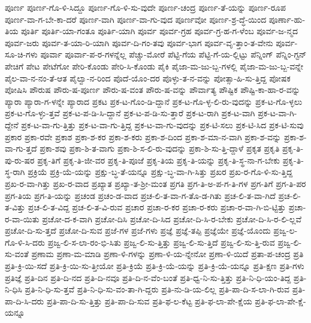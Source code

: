 {ಪೂರ್ಣ
ಪೂರ್ಣ-ಗೊ-ಳಿ-ಸಿದ್ದೂ
ಪೂರ್ಣ-ಗೊ-ಳಿ-ಸು-ವುದೇ
ಪೂರ್ಣ-ಚಂದ್ರ
ಪೂರ್ಣ-ತೆ-ಯನ್ನು
ಪೂರ್ಣ-ರೂಪ
ಪೂರ್ಣ-ವಾ-ಗ-ಬೇ-ಕಾ-ದರೆ
ಪೂರ್ಣ-ವಾಗಿ
ಪೂರ್ಣ-ವಾ-ಗು-ವುದ
ಪೂರ್ಣವೋ
ಪೂರ್ಣ-ಶ್ರ-ದ್ಧೆ-ಯಿಂದ
ಪೂರ್ಣಾ-ಹು-ತಿಯ
ಪೂರ್ತಿ
ಪೂರ್ತಿ-ಯಾ-ಗಂತೂ
ಪೂರ್ತಿ-ಯಾಗಿ
ಪೂರ್ವ
ಪೂರ್ವ-ಗ್ರಹ
ಪೂರ್ವ-ಗ್ರ-ಹ-ಗ-ಳೆಂಬ
ಪೂರ್ವ-ಜ-ನ್ಮದ
ಪೂರ್ವ-ಜರು
ಪೂರ್ವ-ತ-ಯಾ-ರಿ-ಯಾಗಿ
ಪೂರ್ವ-ದಿ-ಗಂ-ತವು
ಪೂರ್ವ-ಭಾಗ
ಪೂರ್ವ-ವೃ-ತ್ತಾಂ-ತ-ವೇನು
ಪೂರ್ವ-ಸೂ-ಚಿ-ಗಳು
ಪೂರ್ವಾ
ಪೂರ್ವಾ-ಪ-ರ-ಗಳನ್ನೆಲ್ಲ
ಪೆಚ್ಚು-ಮೋರೆ
ಪೆಟ್ಟಿ-ಗೆಯ
ಪೆಟ್ಟಿ-ಗೆ-ಯ-ಲ್ಲಿಟ್ಟು
ಪೆನ್ನಿಂಗ್
ಪೆನ್ನಿಂ-ಗ್ಟನ್
ಪೇಚಿಗೆ
ಪೇಟ
ಪೇಟೆಗೋ
ಪೇರಿ-ಕೊಂಡು
ಪೇರಿ-ಸಿ-ಕೊಂಡು
ಪೈಕಿ
ಪೈಜಾ-ಮ-ಜು-ಬ್ಬ-ಗಳಲ್ಲಿ
ಪೈಜಾ-ಮ-ಜು-ಬ್ಬ-ವನ್ನೇ
ಪೈಲ-ವಾ-ನ-ನಂ-ತೆ-ಆತ
ಪೈಲ್ವಾ-ನ-ರಿಂದ
ಪೊದೆ-ಯೊಂ-ದರ
ಪೊಳ್ಳು-ತ-ನ-ವನ್ನು
ಪೋತ್ಸಾ-ಹಿ-ಸು-ತ್ತಿದ್ದ
ಪೋಷಕ
ಪೋಷಿಸಿ
ಪೌರುಷ
ಪೌರು-ಷ-ಪೂರ್ಣ
ಪೌರು-ಷ-ವಂತ
ಪೌರು-ಷ-ವನ್ನು
ಪೌರ್ವಾತ್ಯ
ಪೌಷ್ಟಿಕ
ಪೌಷ್ಟಿ-ಕಾ-ಹಾ-ರ-ವನ್ನು
ಪ್ಯಾರಾ
ಪ್ಯಾರಾ-ಗ-ಳನ್ನೇ
ಪ್ಯಾರಾದ
ಪ್ರಕಟ
ಪ್ರಕ-ಟ-ಗೊಂ-ಡಿ-ದ್ದಾನೆ
ಪ್ರಕ-ಟ-ಗೊ-ಳ್ಳ-ಲಿ-ರು-ವುದನ್ನು
ಪ್ರಕ-ಟ-ಗೊ-ಳ್ಳಲು
ಪ್ರಕ-ಟ-ಗೊ-ಳ್ಳು-ತ್ತವೆ
ಪ್ರಕ-ಟ-ಪ-ಡಿ-ಸಿ-ದ್ದಾನೆ
ಪ್ರಕ-ಟ-ಪ-ಡಿ-ಸು-ತ್ತಾರೆ
ಪ್ರಕ-ಟ-ರಾಗಿ
ಪ್ರಕ-ಟ-ವಾಗಿ
ಪ್ರಕ-ಟ-ವಾ-ಗಿ-ದ್ದೇನೆ
ಪ್ರಕ-ಟ-ವಾ-ಗು-ತ್ತಿತ್ತು
ಪ್ರಕ-ಟ-ವಾ-ಗು-ತ್ತಿದ್ದ
ಪ್ರಕ-ಟ-ವಾ-ಗು-ವುದನ್ನು
ಪ್ರಕ-ಟಿ-ಸಲು
ಪ್ರಕ-ಟಿ-ಸಿದ
ಪ್ರಕ-ಟಿ-ಸುವು
ಪ್ರಕಾರ
ಪ್ರಕಾ-ರವೇ
ಪ್ರಕಾಶ
ಪ್ರಕಾ-ಶ-ಕರ
ಪ್ರಕಾ-ಶ-ಕರು
ಪ್ರಕಾ-ಶ-ದಿಂದ
ಪ್ರಕಾ-ಶ-ಮಾ-ನ-ವಾಗಿ
ಪ್ರಕಾ-ಶ-ವನ್ನು
ಪ್ರಕಾ-ಶ-ವಾ-ಗು-ತ್ತದೆ
ಪ್ರಕಾ-ಶವು
ಪ್ರಕಾ-ಶಿ-ತ-ವಾಗು
ಪ್ರಕಾ-ಶಿ-ಸ-ಲಿ-ರು-ವುದನ್ನು
ಪ್ರಕಾ-ಶಿ-ಸು-ತ್ತಿ-ದ್ದಾಳೆ
ಪ್ರಕೃತ
ಪ್ರಕೃತಿ
ಪ್ರಕೃ-ತಿ-ಪು-ರು-ಷರ
ಪ್ರಕೃ-ತಿಗೆ
ಪ್ರಕೃ-ತಿ-ಜೀ-ವರ
ಪ್ರಕೃ-ತಿ-ಪೂಜೆ
ಪ್ರಕೃ-ತಿಯ
ಪ್ರಕೃ-ತಿ-ಯನ್ನು
ಪ್ರಕೃ-ತಿ-ಸ್ಥ-ನಾ-ಗ-ಬೇಕು
ಪ್ರಕೃ-ತಿ-ಸ್ಥ-ರಾಗಿ
ಪ್ರಕ್ರಿಯೆ
ಪ್ರಕ್ರಿ-ಯೆ-ಯನ್ನು
ಪ್ರಕ್ಷು-ಬ್ಧ-ತೆ-ಯನ್ನೂ
ಪ್ರಕ್ಷು-ಬ್ಧ-ವಾ-ಗಿ-ಸಿತ್ತು
ಪ್ರಖರ
ಪ್ರಖ-ರ-ಗೊ-ಳಿ-ಸು-ತ್ತಿದ್ದ
ಪ್ರಖ-ರ-ವಾ-ಗಿತ್ತು
ಪ್ರಖ-ರ-ವಾದ
ಪ್ರಖ್ಯಾತ
ಪ್ರಖ್ಯಾ-ತ-ಶ್ರೀ-ಮಂತ
ಪ್ರಗತಿ
ಪ್ರಗ-ತಿ-ಅ-ಪ-ಗ-ತಿ-ಗಳ
ಪ್ರಗ-ತಿಗೆ
ಪ್ರಗ-ತಿ-ಪರ
ಪ್ರಗ-ತಿಯ
ಪ್ರಗ-ತಿ-ಯನ್ನು
ಪ್ರಚಂಡ
ಪ್ರಚಂ-ಡ-ವಾದ
ಪ್ರಚ-ಲಿ-ತ-ವಾ-ಗ-ತೊ-ಡ-ಗಿತು
ಪ್ರಚ-ಲಿ-ತ-ವಾ-ಗಿದೆ
ಪ್ರಚ-ಲಿ-ತ-ವಿತ್ತು
ಪ್ರಚ-ಲಿ-ತ-ವಿದ್ದ
ಪ್ರಚ-ಲಿ-ತ-ವಿ-ರುವ
ಪ್ರಚಾರ
ಪ್ರಚಾ-ರ-ಕರ
ಪ್ರಚಾ-ರ-ಕರು
ಪ್ರಚಾ-ರ-ವಾ-ಗಿ-ಬಿ-ಟ್ಟಿತ್ತು
ಪ್ರಚಾ-ರ-ವಾ-ಯಿತು
ಪ್ರಚೋ-ದ-ಕ-ವಾಗಿ
ಪ್ರಚೋ-ದಿಸಿ
ಪ್ರಚೋ-ದಿ-ಸಿದ
ಪ್ರಚೋ-ದಿ-ಸಿ-ರ-ಬೇಕು
ಪ್ರಚೋ-ದಿ-ಸಿ-ರ-ಲಿ-ಲ್ಲವೆ
ಪ್ರಚೋ-ದಿ-ಸು-ತ್ತದೆ
ಪ್ರಚೋ-ದಿ-ಸುವ
ಪ್ರಜೆ-ಗಳ
ಪ್ರಜೆ-ಗಳು
ಪ್ರಜ್ಞೆ
ಪ್ರಜ್ಞೆ-ತಪ್ಪಿ
ಪ್ರಜ್ಞೆಯೇ
ಪ್ರಜ್ಞೆ-ಯೊಂದು
ಪ್ರಜ್ವ-ಲ-ಗೊ-ಳಿ-ಸಿ-ದರು
ಪ್ರಜ್ವ-ಲಿ-ಸ-ಲಾ-ರಂ-ಭಿ-ಸಿತು
ಪ್ರಜ್ವ-ಲಿ-ಸು-ತ್ತಿತ್ತು
ಪ್ರಜ್ವ-ಲಿ-ಸು-ತ್ತಿದೆ
ಪ್ರಜ್ವ-ಲಿ-ಸು-ತ್ತಿ-ರುವ
ಪ್ರಜ್ವ-ಲಿ-ಸು-ವಂತೆ
ಪ್ರಣಾಮ
ಪ್ರಣಾ-ಮ-ಮಾಡಿ
ಪ್ರಣಾ-ಳಿ-ಗಳನ್ನು
ಪ್ರಣಾ-ಳಿ-ಯ-ನ್ನೇನೋ
ಪ್ರಣಾ-ಳಿ-ಯಿದೆ
ಪ್ರತಾ-ಪ-ಚಂದ್ರ
ಪ್ರತಿ
ಪ್ರತಿ-ಕ್ರಿ-ಯಿ-ಸದೆ
ಪ್ರತಿ-ಕ್ರಿ-ಯಿ-ಸು-ತ್ತೀಯೋ
ಪ್ರತಿ-ಕ್ರಿಯೆ
ಪ್ರತಿ-ಕ್ರಿ-ಯೆ-ಯನ್ನು
ಪ್ರತಿ-ಕ್ರಿ-ಯೆ-ಯನ್ನೂ
ಪ್ರತಿ-ಕ್ಷಣ
ಪ್ರತಿ-ಗಳು
ಪ್ರತಿಜ್ಞೆ
ಪ್ರತಿ-ದಿನ
ಪ್ರತಿ-ದಿ-ನದ
ಪ್ರತಿ-ದಿ-ನವೂ
ಪ್ರತಿ-ದಿ-ನ-ವೆಂ-ಬಂತೆ
ಪ್ರತಿ-ಧ್ವ-ನಿ-ಸು-ತ್ತಿತ್ತು
ಪ್ರತಿ-ನಿ-ಧಿ-ಯಂ-ತಿದ್ದ
ಪ್ರತಿ-ನಿ-ಧಿಸಿ
ಪ್ರತಿ-ನಿ-ಧಿ-ಸು-ತ್ತವೆ
ಪ್ರತಿ-ನಿ-ಧಿ-ಸು-ವಂ-ತಾ-ಗಿ-ದ್ದರು
ಪ್ರತಿ-ನು-ಡಿ-ಯ-ಲಿಲ್ಲ
ಪ್ರತಿ-ಪಾ-ದಿ-ಸ-ಲಾ-ಗಿ-ರುವ
ಪ್ರತಿ-ಪಾ-ದಿ-ಸಿ-ದರು
ಪ್ರತಿ-ಪಾ-ದಿ-ಸು-ತ್ತಿತ್ತು
ಪ್ರತಿ-ಪಾ-ದಿ-ಸುವ
ಪ್ರತಿ-ಫ-ಲ-ಕೆಟ್ಟ
ಪ್ರತಿ-ಫ-ಲಾ-ಪೇ-ಕ್ಷೆಯ
ಪ್ರತಿ-ಫ-ಲಾ-ಪೇ-ಕ್ಷೆ-ಯನ್ನೂ
}
